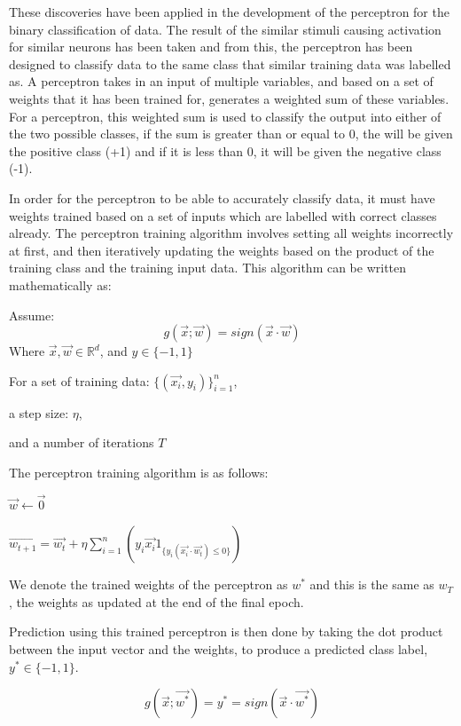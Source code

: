 \documentclass[10pt,twocolumn,a4paper]{article}
\begin{document}
These discoveries have been applied in the development of the perceptron for the binary classification of data. The result of the similar stimuli causing activation for similar neurons has been taken and from this, the perceptron has been designed to classify data to the same class that similar training data was labelled as. A perceptron takes in an input of multiple variables, and based on a set of weights that it has been trained for, generates a weighted sum of these variables. For a perceptron, this weighted sum is used to classify the output into either of the two possible classes, if the sum is greater than or equal to 0, the will be given the positive class (+1) and if it is less than 0, it will be given the negative class (-1).\cite{LIANG20201}

In order for the perceptron to be able to accurately classify data, it must have weights trained based on a set of inputs which are labelled with correct classes already. The perceptron training algorithm involves setting all weights incorrectly at first, and then iteratively updating the weights based on the product of the training class and the training input data. This algorithm can be written mathematically as:

Assume:
\[ g(\vec{x}; \vec{w}) = sign(\vec{x} \cdot \vec{w}) \]
Where $ \vec{x},\vec{w} \in \mathbb{R}^d $, and $y \in \{-1, 1\} $

For a set of training data: $ \{(\vec{x_i}, y_i)\}_{i=1}^n $,

a step size: $\eta$,

and a number of iterations $T$

The perceptron training algorithm is as follows:
\begin{algorithmic}
\State $\vec{w} \gets \vec{0}$

    $\vec{w_{t+1}} = \vec{w_t} + \eta \sum_{i=1}^n(y_i \vec{x_i} 1_{\{ y_i (\vec{x_i} \cdot \vec{w_t}  ) \leq 0 \}})$
\EndFor
\end{algorithmic} \cite{adelaideunilecture}

We denote the trained weights of the perceptron as $w^*$ and this is the same as $w_T$, the weights as updated at the end of the final epoch.

Prediction using this trained perceptron is then done by taking the dot product between the input vector and the weights, to produce a predicted class label, $y^* \in \{-1, 1\}$.

\[ g(\vec{x}; \vec{w^*}) = y^* = sign(\vec{x} \cdot \vec{w^*} ) \]
\end{document}
